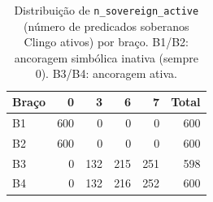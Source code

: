 \begin{table}[htbp]
\centering
\caption{Distribuição de \texttt{n\_sovereign\_active} (número de predicados soberanos Clingo ativos) por braço. B1/B2: ancoragem simbólica inativa (sempre 0). B3/B4: ancoragem ativa.}
\label{tab:t3_sovereign}
\small
\begin{tabular}{lrrrrr}
\toprule
Braço & 0 & 3 & 6 & 7 & Total \\
\midrule
B1 & 600 & 0 & 0 & 0 & 600 \\
B2 & 600 & 0 & 0 & 0 & 600 \\
B3 & 0 & 132 & 215 & 251 & 598 \\
B4 & 0 & 132 & 216 & 252 & 600 \\
\bottomrule
\end{tabular}
\end{table}
